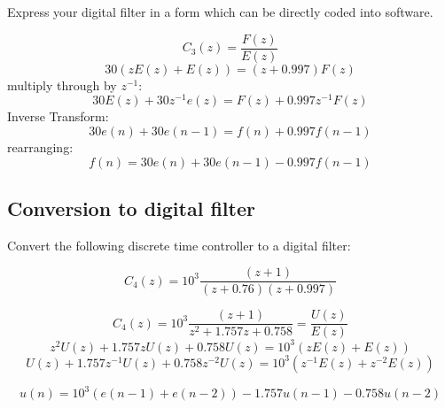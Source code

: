 \documentclass{article}	%
\begin{document}
Express your digital filter in a form which can be directly coded into software.


\begin{solution}
\[
C_3(z) = \frac{F(z)}{E(z)}
\]
\[
30(zE(z) + E(z)) = (z+0.997)F(z)
\]
multiply through by $z^{-1}$:
\[
30E(z) + 30z^{-1}e(z) = F(z)+ 0.997z^{-1}F(z)
\]
Inverse Transform:
\[
30e(n) + 30e(n-1)  = f(n) + 0.997f(n-1)
\]
rearranging:
\[
f(n) = 30e(n) + 30e(n-1) - 0.997f(n-1)
\]
\end{solution}


\subsection{Conversion to digital filter}


Convert the following discrete time controller to a digital filter:

\[
C_4(z) = 10^3\frac{(z+1)}{(z+0.76)(z+0.997)}
\]



\begin{solution}
\[
C_4(z) = 10^3\frac{(z+1)}{z^2+1.757z+0.758} = \frac{U(z)}{E(z)}
\]
\[
z^2U(z)+1.757zU(z)+0.758U(z) = 10^3(zE(z)+E(z))
\]
\[
U(z)+1.757z^{-1}U(z)+0.758z^{-2}U(z) = 10^3(z^{-1}E(z)+z^{-2}E(z))
\]

\[
u(n) = 10^3(e(n-1)+e(n-2))-1.757u(n-1)-0.758u(n-2)
\]
\end{solution}

\end{document}
